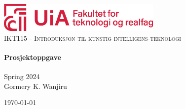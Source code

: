 \begin{titlepage}
    \vbox{ }

    \vbox{ }

    \begin{center}
        \includegraphics[width=0.6\textwidth]{Figures/Frontpage/tekreal}\\[4cm]
        \textsc{\Large IKT115 - Introduksjon til kunstig intelligens-teknologi}\\[0.7cm]

        \noindent\makebox[\linewidth]{\rule{.7\paperwidth}{.6pt}}\\[0.7cm]
        { \huge \bfseries Prosjektoppgave}\\[0.25cm]
        \noindent\makebox[\linewidth]{\rule{.7\paperwidth}{.6pt}}\\[0.7cm]
        \large{Spring 2024}\\[1.2cm]
        \vfill
        \large
        Gormery K. Wanjiru

        {\large \today}
    \end{center}
\end{titlepage}